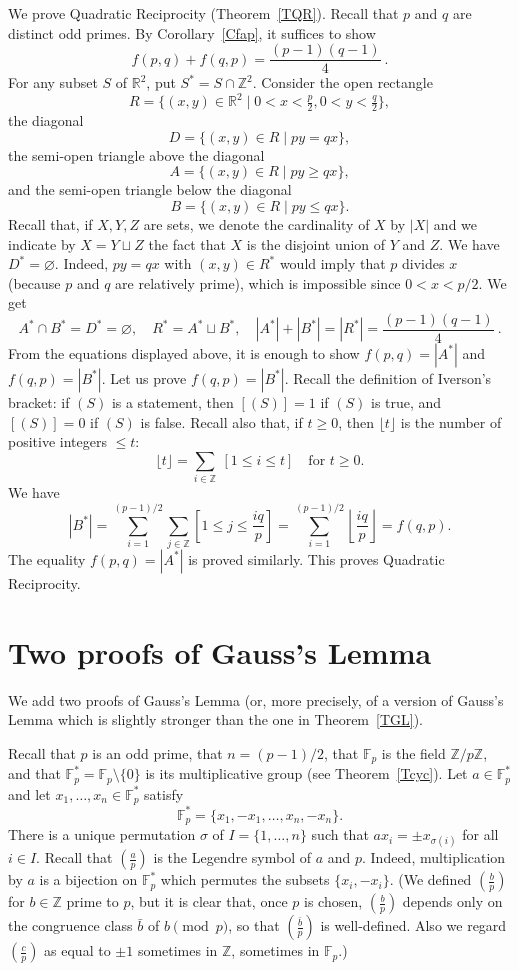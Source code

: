 \documentclass[12pt,letterpaper]{article}
\newcommand{\F}{\mathbb F}
\newcommand{\Z}{\mathbb Z}
\begin{document}
We prove Quadratic Reciprocity (Theorem~\ref{TQR}). Recall that \(p\) and \(q\) are distinct odd primes. By Corollary~\ref{Cfap}, it suffices to show 
\[
f(p,q)+f(q,p)=\frac{(p-1)(q-1)}4\ . 
\] 
For any subset \(S\) of \(\mathbb R^2\), put \(S^*=S\cap\Z^2\). Consider the open rectangle 
\[
R=\{(x,y)\in\mathbb R^2\mid 0<x<\tfrac p2,0<y<\tfrac q2\},
\] 
the diagonal 
\[
D=\{(x,y)\in R\mid py=qx\},
\] 
the semi-open triangle above the diagonal 
\[
A=\{(x,y)\in R\mid py\ge qx\}, 
\] 
and the semi-open triangle below the diagonal 
\[
B=\{(x,y)\in R\mid py\le qx\}.
\] 
Recall that, if \(X,Y,Z\) are sets, we denote the cardinality of \(X\) by \(|X|\) and we indicate by \(X=Y\sqcup Z\) the fact that \(X\) is the disjoint union of \(Y\) and \(Z\). We have \(D^*=\varnothing\). Indeed, \(py=qx\) with \((x,y)\in R^*\) would imply that \(p\) divides \(x\) (because \(p\) and \(q\) are relatively prime), which is impossible since \(0<x<p/2\). We get 
\[
A^*\cap B^*=D^*=\varnothing,\quad R^*=A^*\sqcup B^*,\quad|A^*|+|B^*|=|R^*|=\frac{(p-1)(q-1)}4\ .
\] 
From the equations displayed above, it is enough to show \(f(p,q)=|A^*|\) and \(f(q,p)=|B^*|\). Let us prove \(f(q,p)=|B^*|\). Recall the definition of Iverson's bracket: if \((S)\) is a statement, then \([(S)]=1\) if \((S)\) is true, and \([(S)]=0\) if \((S)\) is false. Recall also that, if \(t\ge0\), then \(\lfloor t\rfloor\) is the number of positive integers \(\le t\): 
\[
\lfloor t\rfloor=\sum_{i\in\Z}\ [1\le i\le t]\quad\text{for }t\ge0.
\] 
We have 
\[
|B^*|=\sum_{i=1}^{(p-1)/2}\sum_{j\in\Z}\left[1\le j\le\frac{iq}p\right]=\sum_{i=1}^{(p-1)/2}\left\lfloor\frac{iq}p\right\rfloor=f(q,p).
\] 
The equality \(f(p,q)=|A^*|\) is proved similarly. This proves Quadratic Reciprocity. 

\section{Two proofs of Gauss's Lemma}%

We add two proofs of Gauss's Lemma (or, more precisely, of a version of Gauss's Lemma which is slightly stronger than the one in Theorem~\ref{TGL}). 

Recall that \(p\) is an odd prime, that \(n=(p-1)/2\), that \(\F_p\) is the field \(\Z/p\Z\), and that \(\F_p^*=\F_p\setminus\{0\}\) is its multiplicative group (see Theorem~\ref{Tcyc}). Let \(a\in\F_p^*\) and let \(x_1,\ldots,x_n\in\F_p^*\) satisfy 
\[
\F_p^*=\{x_1,-x_1,\ldots,x_n,-x_n\}.
\]  
There is a unique permutation \(\sigma\) of \(I=\{1,\ldots,n\}\) such that \(ax_i=\pm x_{\sigma(i)}\) for all \(i\in I\). Recall that \((\frac ap)\) is the Legendre symbol of \(a\) and \(p\). Indeed, multiplication by \(a\) is a bijection on \(\F_p^*\) which permutes the subsets \(\{x_i, -x_i\}\). (We defined \((\frac bp)\) for \(b\in\Z\) prime to \(p\), but it is clear that, once \(p\) is chosen, \((\frac bp)\) depends only on the congruence class \(\bar b\) of \(b\pmod{p}\), so that \((\frac{\bar b}p)\) is well-defined. Also we regard \((\frac cp)\) as equal to \(\pm1\) sometimes in \(\Z\), sometimes in \(\F_p\).) 
\end{document}
